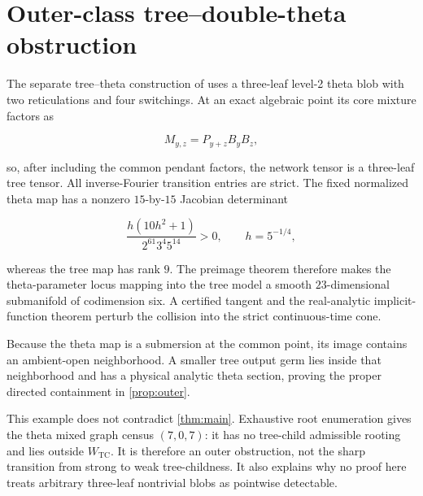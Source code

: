 \section{Outer-class tree--double-theta obstruction}
\label{sec:outer-obstruction}

The separate tree--theta construction of \cite{KriebelTreeTheta2026} uses a
three-leaf level-2 theta blob with two reticulations and four switchings.  At
an exact algebraic point its core mixture factors as

\[
 M_{y,z}=P_{y+z}B_yB_z,
\]

so, after including the common pendant factors, the network tensor is a
three-leaf tree tensor.  All inverse-Fourier transition entries are strict.
The fixed normalized theta map has a nonzero \(15\)-by-\(15\) Jacobian
determinant

\[
 \frac{h(10h^2+1)}{2^{61}3^4 5^{14}}>0,
 \qquad h=5^{-1/4},
\]

whereas the tree map has rank \(9\).  The preimage theorem therefore makes
the theta-parameter locus mapping into the tree model a smooth
\(23\)-dimensional submanifold of codimension six.  A certified tangent and
the real-analytic implicit-function theorem perturb the collision into the
strict continuous-time cone.

Because the theta map is a submersion at the common point, its image contains
an ambient-open neighborhood.  A smaller tree output germ lies inside that
neighborhood and has a physical analytic theta section, proving the proper
directed containment in \cref{prop:outer}.

This example does not contradict \cref{thm:main}.  Exhaustive root
enumeration gives the theta mixed graph census \((7,0,7)\): it has no
tree-child admissible rooting and lies outside \(W_{\mathrm{TC}}\).  It is
therefore an outer obstruction, not the sharp transition from strong to weak
tree-childness.  It also explains why no proof here treats arbitrary
three-leaf nontrivial blobs as pointwise detectable.
